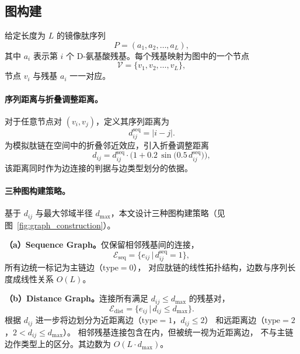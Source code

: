 \subsection{图构建}

给定长度为 $L$ 的镜像肽序列
\begin{equation}
P=(a_1,a_2,\ldots,a_L),
\end{equation}
其中 $a_i$ 表示第 $i$ 个 D-氨基酸残基。每个残基映射为图中的一个节点
\begin{equation}
\mathcal{V}=\{v_1,v_2,\ldots,v_L\},
\end{equation}
节点 $v_i$ 与残基 $a_i$ 一一对应。

\paragraph{序列距离与折叠调整距离。}
对于任意节点对 $(v_i,v_j)$，定义其序列距离为
\begin{equation}
d_{ij}^{\mathrm{seq}} = |i-j|.
\end{equation}
为模拟肽链在空间中的折叠邻近效应，引入折叠调整距离
\begin{equation}
d_{ij} = d_{ij}^{\mathrm{seq}} \cdot \Big( 1 + 0.2\,\sin\big(0.5\,d_{ij}^{\mathrm{seq}}\big) \Big),
\label{eq:fold_dist}
\end{equation}
该距离同时作为边连接的判据与边类型划分的依据。

\paragraph{三种图构建策略。}
基于 $d_{ij}$ 与最大邻域半径 $d_{\max}$，本文设计三种图构建策略（见图~\ref{fig:graph_construction}）。

\textbf{（a）Sequence Graph。}仅保留相邻残基间的连接，
\begin{equation}
\mathcal{E}_{\mathrm{seq}} = \big\{ e_{ij} \,\big|\, d_{ij}^{\mathrm{seq}} = 1 \big\},
\end{equation}
所有边统一标记为主链边（$\mathrm{type}=0$），
对应肽链的线性拓扑结构，边数与序列长度成线性关系 $O(L)$。

\textbf{（b）Distance Graph。}连接所有满足 $d_{ij}\le d_{\max}$ 的残基对，
\begin{equation}
\mathcal{E}_{\mathrm{dist}} = \big\{ e_{ij} \,\big|\, d_{ij} \le d_{\max} \big\}.
\end{equation}
根据 $d_{ij}$ 进一步将边划分为近距离边（$\mathrm{type}=1$，$d_{ij}\le 2$）
和远距离边（$\mathrm{type}=2$，$2<d_{ij}\le d_{\max}$）。
相邻残基连接包含在内，但被统一视为近距离边，
不与主链边作类型上的区分。其边数为 $O(L\cdot d_{\max})$。

